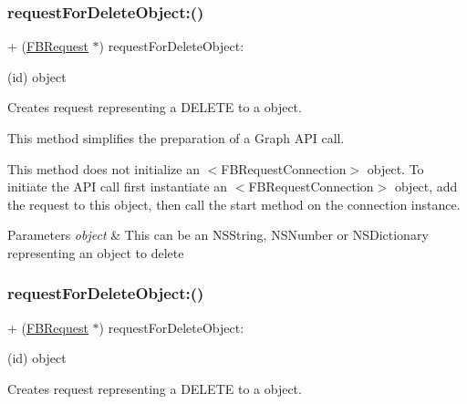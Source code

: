 \subsubsection{\texorpdfstring{request\+For\+Delete\+Object\+:()}{requestForDeleteObject:()}\hspace{0.1cm}{\footnotesize\ttfamily [2/5]}}
{\footnotesize\ttfamily + (\hyperlink{interfaceFBRequest}{F\+B\+Request} $\ast$) request\+For\+Delete\+Object\+: \begin{DoxyParamCaption}\item[{(id)}]{object }\end{DoxyParamCaption}}

Creates request representing a D\+E\+L\+E\+TE to a object.

This method simplifies the preparation of a Graph A\+PI call.

This method does not initialize an $<$\+F\+B\+Request\+Connection$>$ object. To initiate the A\+PI call first instantiate an $<$\+F\+B\+Request\+Connection$>$ object, add the request to this object, then call the {\ttfamily start} method on the connection instance.


\begin{DoxyParams}{Parameters}
{\em object} & This can be an N\+S\+String, N\+S\+Number or N\+S\+Dictionary representing an object to delete \\
\hline
\end{DoxyParams}
\mbox{\label{interfaceFBRequest_a6d457b796765de6b436e5ff6cf11cc44}} 
\subsubsection{\texorpdfstring{request\+For\+Delete\+Object\+:()}{requestForDeleteObject:()}\hspace{0.1cm}{\footnotesize\ttfamily [3/5]}}
{\footnotesize\ttfamily + (\hyperlink{interfaceFBRequest}{F\+B\+Request} $\ast$) request\+For\+Delete\+Object\+: \begin{DoxyParamCaption}\item[{(id)}]{object }\end{DoxyParamCaption}}

Creates request representing a D\+E\+L\+E\+TE to a object.

